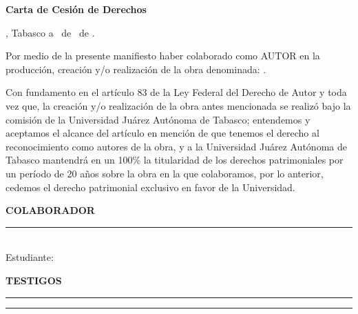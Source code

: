 \thispagestyle{empty}
\large

\begin{center}
    \textbf{\Large Carta de Cesión de Derechos}
\end{center}

\begin{flushright}
    \Ciudad, Tabasco a \Dia\ de \Mes\ de \Anho.
\end{flushright}

\vspace{1cm}

Por medio de la presente manifiesto haber colaborado como AUTOR en la
producción, creación y/o realización de la obra denominada:
\textbf{\Titulo}.

Con fundamento en el artículo 83 de la Ley Federal del Derecho de Autor y
toda vez que, la creación y/o realización de la obra antes mencionada se
realizó bajo la comisión de la Universidad Juárez Autónoma de Tabasco;
entendemos y aceptamos el alcance del artículo en mención de que tenemos el
derecho al reconocimiento como autores de la obra, y a la Universidad Juárez
Autónoma de Tabasco mantendrá en un 100\% la titularidad de los derechos
patrimoniales por un período de 20 años sobre la obra en la que colaboramos,
por lo anterior, cedemos el derecho patrimonial exclusivo en favor de la
Universidad.

\begin{center}
    \textbf{COLABORADOR}
\end{center}

\vspace{0.3cm}

\begin{center}
    \rule{6cm}{0.4pt}\\
    Estudiante: \Autor
\end{center}

\vspace{0.5cm}

\begin{center}
    \textbf{TESTIGOS}
\end{center}

\vspace{0.3cm}

\begin{center}
    \rule{6cm}{0.4pt} \hfill \rule{6cm}{0.4pt} \\
    \Director \hfill \DirectorGrado
\end{center}

\normalsize
